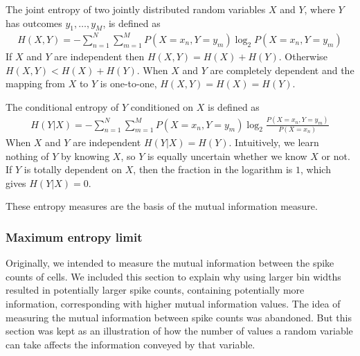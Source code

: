         The joint entropy of two jointly distributed random variables $X$ and $Y$, where $Y$ has outcomes $y_1, \dots, y_M$, is defined as
        \begin{align}\label{joint_entropy}
        H(X, Y) = -\sum_{n=1}^N \sum_{m=1}^M P(X=x_n, Y=y_m) \log _2 P(X=x_n, Y=y_m)
        \end{align}
        If $X$ and $Y$ are independent then $H(X,Y) = H(X) + H(Y)$. Otherwise $H(X,Y) < H(X) + H(Y)$. When $X$ and $Y$ are completely dependent and the mapping from $X$ to $Y$ is one-to-one, $H(X,Y) = H(X) = H(Y)$.

        The conditional entropy of $Y$ conditioned on $X$ is defined as
        \begin{align}
        H(Y|X) = -\sum_{n=1}^N \sum_{m=1}^M P(X=x_n, Y=y_m) \log _2 \frac{P(X=x_n, Y=y_m)}{P(X=x_n)}
        \end{align}
        When $X$ and $Y$ are independent $H(Y|X) = H(Y)$. Intuitively, we learn nothing of $Y$ by knowing $X$, so $Y$ is equally uncertain whether we know $X$ or not. If $Y$ is totally dependent on $X$, then the fraction in the logarithm is $1$, which gives $H(Y|X) = 0$.

        These entropy measures are the basis of the mutual information measure.

        \subsubsection{Maximum entropy limit}\label{sec:entropy_limit}
        Originally, we intended to measure the mutual information between the spike counts of cells. We included this section to explain why using larger bin widths resulted in potentially larger spike counts, containing potentially more information, corresponding with higher mutual information values. The idea of measuring the mutual information between spike counts was abandoned. But this section was kept as an illustration of how the number of values a random variable can take affects the information conveyed by that variable.


